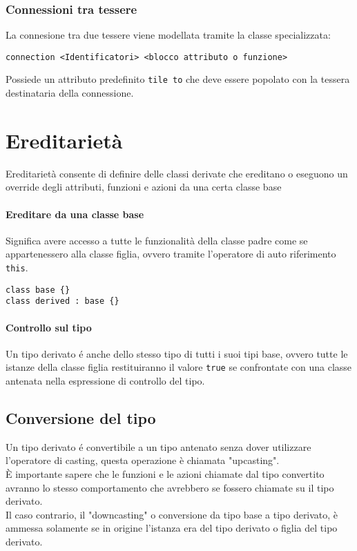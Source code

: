 \subsubsection{Connessioni tra tessere}
La connesione tra due tessere viene modellata tramite la classe specializzata:
\begin{lstlisting}
connection <Identificatori> <blocco attributo o funzione>
\end{lstlisting}
Possiede un attributo predefinito \lstinline|tile to| che deve essere popolato con la tessera 
destinataria della connessione.

\section{Ereditarietà}
Ereditarietà consente di definire delle classi derivate che ereditano o eseguono un override degli attributi, funzioni e azioni 
da una certa classe base
\paragraph{Ereditare da una classe base} 
Significa avere accesso a tutte le funzionalità della classe padre come se appartenessero alla classe figlia,
ovvero tramite l'operatore di auto riferimento \lstinline|this|.
\begin{lstlisting}
class base {}
class derived : base {}
\end{lstlisting}
\paragraph{Controllo sul tipo}
Un tipo derivato é anche dello stesso tipo di tutti i suoi tipi base, ovvero tutte le istanze
della classe figlia restituiranno il valore \lstinline|true| se confrontate con una classe 
antenata nella espressione di controllo del tipo. 

\subsection{Conversione del tipo}
Un tipo derivato é convertibile a un tipo antenato senza dover utilizzare l'operatore di casting,
questa operazione è chiamata "upcasting". \\
È importante sapere che le funzioni e le azioni chiamate dal tipo convertito avranno 
lo stesso comportamento che avrebbero se fossero chiamate su il tipo derivato. \\
Il caso contrario, il "downcasting" o conversione da tipo base a tipo derivato, è ammessa solamente
se in origine l'istanza era del tipo derivato o figlia del tipo derivato. 

